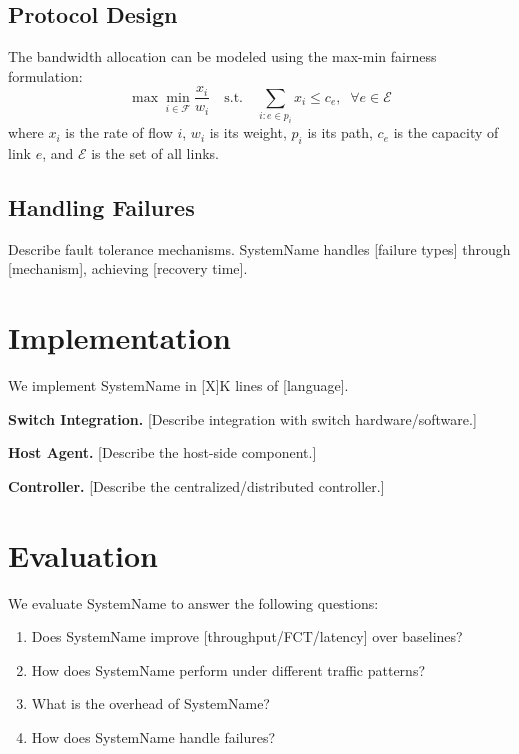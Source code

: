 \documentclass[letterpaper,twocolumn,10pt]{article}
\newcommand{\system}{SystemName\xspace}
\newcommand{\para}[1]{\smallskip\noindent\textbf{#1.}}
\begin{document}
\subsection{Protocol Design}

The bandwidth allocation can be modeled using the max-min fairness
formulation:
\begin{equation}
  \label{eq:fairness}
  \max \min_{i \in \mathcal{F}} \frac{x_i}{w_i}
  \quad \text{s.t.} \quad
  \sum_{i: e \in p_i} x_i \leq c_e, \;\; \forall e \in \mathcal{E}
\end{equation}
where $x_i$ is the rate of flow $i$, $w_i$ is its weight, $p_i$ is
its path, $c_e$ is the capacity of link $e$, and $\mathcal{E}$ is
the set of all links.

\subsection{Handling Failures}

Describe fault tolerance mechanisms. \system handles [failure types]
through [mechanism], achieving [recovery time].

\section{Implementation}
\label{sec:implementation}

We implement \system in [X]K lines of [language].

\para{Switch Integration}
[Describe integration with switch hardware/software.]

\para{Host Agent}
[Describe the host-side component.]

\para{Controller}
[Describe the centralized/distributed controller.]

\section{Evaluation}
\label{sec:evaluation}

We evaluate \system to answer the following questions:
\begin{enumerate}
  \item Does \system improve [throughput/FCT/latency] over baselines?
  \item How does \system perform under different traffic patterns?
  \item What is the overhead of \system?
  \item How does \system handle failures?
\end{enumerate}
\end{document}
